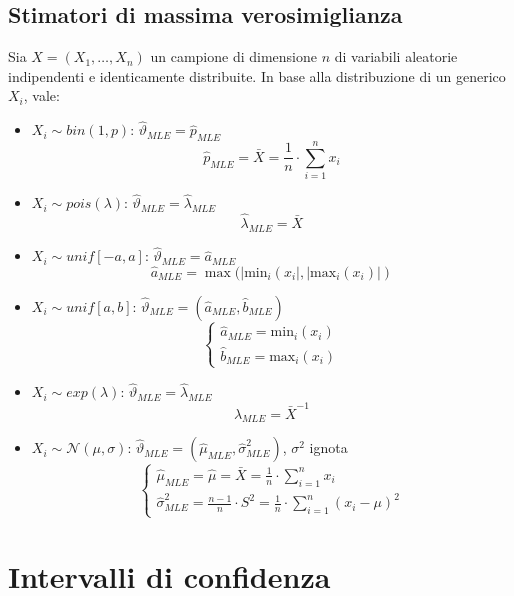 \documentclass[12pt, a4paper]{report}
\theoremstyle{definition}
\begin{document}
\subsection{Stimatori di massima verosimiglianza}
Sia $X=(X_1,\dots,X_n)$ un campione di dimensione $n$ di variabili aleatorie
indipendenti e identicamente distribuite. In base alla distribuzione di un
generico $X_i$, vale:
\begin{itemize}
    \item $X_i\sim bin(1,p)$: $\hat{\vartheta}_{MLE}=\hat{p}_{MLE}$
    \[\hat{p}_{MLE}=\bar{X}=\frac{1}{n}\cdot\sum_{i=1}^n x_i\]

    \item $X_i\sim pois(\lambda)$: $\hat{\vartheta}_{MLE}=\hat{\lambda}_{MLE}$
    \[\hat{\lambda}_{MLE}=\bar{X}\]

    \item $X_i\sim unif[-a,a]$: $\hat{\vartheta}_{MLE}=\hat{a}_{MLE}$
    \[\hat{a}_{MLE}=\max{(|\text{min}_i(x_i|,|\text{max}_i(x_i)|)}\]

    \item $X_i\sim unif[a,b]$: $\hat{\vartheta}_{MLE}=(\hat{a}_{MLE},\hat{b}_{MLE})$
    \[\begin{cases}
        \hat{a}_{MLE}=\text{min}_i(x_i)\\
        \hat{b}_{MLE}=\text{max}_i(x_i)
    \end{cases}\]

    \item $X_i\sim exp(\lambda)$: $\hat{\vartheta}_{MLE}=\hat{\lambda}_{MLE}$
    \[\hat{\lambda}_{MLE}=\bar{X}^{-1}\]

    \item $X_i\sim\mathcal{N}(\mu,\sigma)$:
    $\hat{\vartheta}_{MLE}=(\hat{\mu}_{MLE},\hat{\sigma}^2_{MLE})$, $\sigma^2$
    ignota
    \[\begin{cases}
        \hat{\mu}_{MLE}=\hat{\mu}=\bar{X}=\frac{1}{n}\cdot\sum_{i=1}^n x_i\\
        \hat{\sigma}^2_{MLE}=\frac{n-1}{n}\cdot S^2=\frac{1}{n}\cdot\sum_{i=1}^n
        (x_i-\mu)^2
    \end{cases}\]
\end{itemize}

\section{Intervalli di confidenza}
\end{document}

